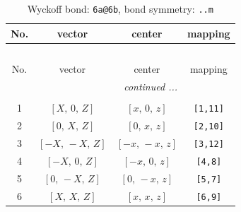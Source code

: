 \documentclass[fleqn,8pt]{jsarticle}
\begin{document}
\begin{longtable}{cccc}
\caption{Wyckoff bond: {\tt 6a@6b}, bond symmetry: {\tt ..m}}
 \\
 \hline \hline
No. & vector & center & mapping \\ \hline \endfirsthead

\multicolumn{3}{l}{\tablename\ \thetable{}} \\
 \hline \hline
No. & vector & center & mapping \\ \hline \endhead

 \hline \hline
\multicolumn{3}{r}{\footnotesize\it continued ...} \\ \endfoot

 \hline \hline
\multicolumn{3}{r}{} \\ \endlastfoot

1 & $\left[ X,\, 0,\, Z \right]$ & $\left[ x,\, 0,\, z \right]$ & {\tt [1,11]} \\ \hline
2 & $\left[ 0,\, X,\, Z \right]$ & $\left[ 0,\, x,\, z \right]$ & {\tt [2,10]} \\ \hline
3 & $\left[ - X,\, - X,\, Z \right]$ & $\left[ - x,\, - x,\, z \right]$ & {\tt [3,12]} \\ \hline
4 & $\left[ - X,\, 0,\, Z \right]$ & $\left[ - x,\, 0,\, z \right]$ & {\tt [4,8]} \\ \hline
5 & $\left[ 0,\, - X,\, Z \right]$ & $\left[ 0,\, - x,\, z \right]$ & {\tt [5,7]} \\ \hline
6 & $\left[ X,\, X,\, Z \right]$ & $\left[ x,\, x,\, z \right]$ & {\tt [6,9]} \\
\end{longtable}
\renewcommand{\arraystretch}{1.2}
\end{document}

